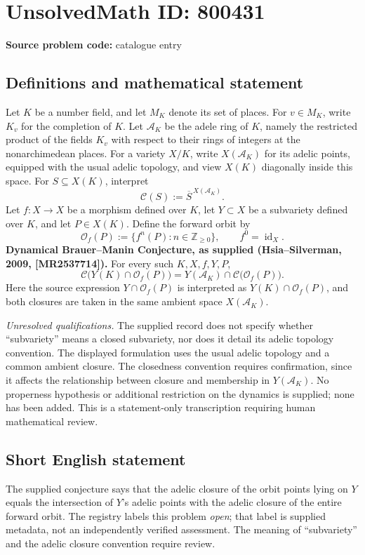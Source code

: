 \documentclass[11pt]{article}
\begin{document}
\section*{UnsolvedMath ID: 800431}
\textbf{Source problem code:} catalogue entry
\subsection{Definitions and mathematical statement}
Let \(K\) be a number field, and let \(M_K\) denote its set of places. For \(v\in M_K\), write \(K_v\) for the completion of \(K\). Let \(\mathcal A_K\) be the adele ring of \(K\), namely the restricted product of the fields \(K_v\) with respect to their rings of integers at the nonarchimedean places. For a variety \(X/K\), write \(X(\mathcal A_K)\) for its adelic points, equipped with the usual adelic topology, and view \(X(K)\) diagonally inside this space. For \(S\subseteq X(K)\), interpret
\[
\mathcal C(S):=\overline{S}^{\,X(\mathcal A_K)}.
\]
Let \(f:X\to X\) be a morphism defined over \(K\), let \(Y\subset X\) be a subvariety defined over \(K\), and let \(P\in X(K)\). Define the forward orbit by
\[
\mathcal O_f(P):=\{f^n(P):n\in\mathbb Z_{\geq 0}\},\qquad f^0=\operatorname{id}_X.
\]
\textbf{Dynamical Brauer--Manin Conjecture, as supplied (Hsia--Silverman, 2009, [MR2537714]).} For every such \(K,X,f,Y,P\),
\[
\mathcal C\bigl(Y(K)\cap\mathcal O_f(P)\bigr)
=
Y(\mathcal A_K)\cap\mathcal C\bigl(\mathcal O_f(P)\bigr).
\]
Here the source expression \(Y\cap\mathcal O_f(P)\) is interpreted as \(Y(K)\cap\mathcal O_f(P)\), and both closures are taken in the same ambient space \(X(\mathcal A_K)\).

\textit{Unresolved qualifications.} The supplied record does not specify whether ``subvariety'' means a closed subvariety, nor does it detail its adelic topology convention. The displayed formulation uses the usual adelic topology and a common ambient closure. The closedness convention requires confirmation, since it affects the relationship between closure and membership in \(Y(\mathcal A_K)\). No properness hypothesis or additional restriction on the dynamics is supplied; none has been added. This is a statement-only transcription requiring human mathematical review.
\subsection{Short English statement}
The supplied conjecture says that the adelic closure of the orbit points lying on \(Y\) equals the intersection of \(Y\)'s adelic points with the adelic closure of the entire forward orbit. The registry labels this problem \emph{open}; that label is supplied metadata, not an independently verified assessment. The meaning of ``subvariety'' and the adelic closure convention require review.
\end{document}
